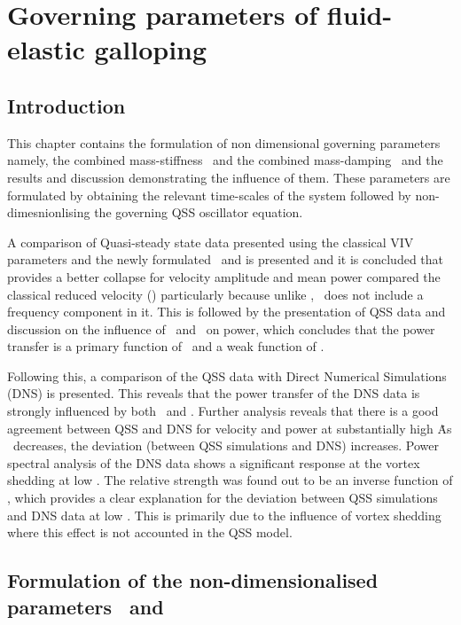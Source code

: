 \chapter{Governing parameters of  fluid-elastic galloping}
\label{chap:goven_para}

\section{Introduction}

This chapter contains the formulation of non dimensional governing parameters namely, the combined mass-stiffness \massstiff \ and the combined mass-damping \massdamp \ and the results and discussion demonstrating the influence of them. These parameters are formulated by obtaining the relevant time-scales of the system followed by non-dimesnionlising the governing QSS oscillator equation.  

A comparison of Quasi-steady state data presented using the classical VIV parameters and the newly formulated \massstiff \ and \massdamp is presented and it is concluded that \massdamp provides a better collapse for velocity amplitude and mean power compared the classical reduced velocity (\ustar) particularly because unlike \ustar, \massdamp \ does not include a frequency component in it. This is followed by the presentation of QSS data and discussion on the influence of \massstiff \ and \massdamp \ on power, which concludes that the power transfer is a primary function of \massdamp \ and a weak function of \massstiff.

Following this, a comparison of the QSS data with Direct Numerical Simulations (DNS) is presented. This reveals that the power transfer of the DNS data is strongly influenced by both \massstiff \ and \massdamp. Further analysis reveals that there is a good agreement between QSS and DNS for velocity and power at substantially high \massstiff\. As \massstiff \ decreases, the deviation (between QSS simulations and DNS) increases. Power spectral analysis of the DNS data shows a significant response at the vortex shedding at low \massstiff. The relative strength was found out to be an inverse function of \massstiff, which provides a clear explanation for the deviation between QSS simulations and DNS data at low \massstiff. This is primarily due to the influence of vortex shedding where this effect is not accounted in the QSS model.


\section{Formulation of the non-dimensionalised parameters \massstiff \ and \massdamp }
\label{sec: pi_1,pi_2_formulation}

